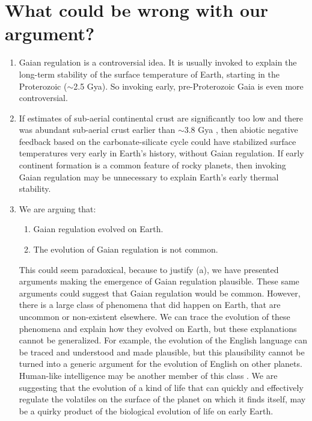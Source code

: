 \section{What could be wrong with our argument?}
\begin{enumerate}
	\item Gaian regulation is a controversial idea.  It is usually invoked to explain the long-term stability of the surface temperature of Earth, starting in the Proterozoic ($\sim$2.5 Gya). So invoking early, pre-Proterozoic Gaia is even more controversial.
	
	\item If estimates of sub-aerial continental crust \citep[\eg, by][]{Flament2008} are significantly too low and there was abundant sub-aerial crust earlier than  
	$\sim$3.8 Gya \citep[\eg,][]{VanKranendonk2010}, then abiotic negative feedback based on the
	carbonate-silicate cycle could have stabilized surface temperatures very early in Earth's history, without Gaian regulation. If early continent formation
	is a common feature of rocky planets, then invoking Gaian regulation may be unnecessary to explain Earth's early thermal stability.
	
	\item We are arguing that:
	\begin{enumerate}
		\item Gaian regulation evolved on Earth.
		\item The evolution of Gaian regulation is not common.
	\end{enumerate}
	This could seem paradoxical, because to justify (a), we have presented arguments making the emergence of Gaian regulation plausible. 
	These same arguments could suggest that Gaian regulation would be common. However, there is a large class of phenomena that did happen on Earth, that are uncommon or non-existent elsewhere.
	We can trace the evolution of these phenomena and explain how they evolved on Earth, but these explanations cannot be generalized.
	For example, the evolution of the English language can be traced and understood and made plausible, but this plausibility cannot be turned 
	into a generic argument for the evolution of English on other planets. 
	Human-like intelligence may be another member of this class \citep{Lineweaver2008}. We are suggesting that the evolution of a kind of life that can quickly and effectively regulate the volatiles on the surface of the planet on which it finds itself, may be a quirky product of the biological evolution of life on early Earth.
	

\end{enumerate}
